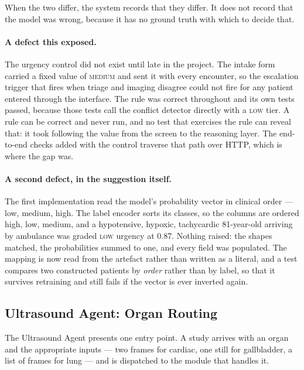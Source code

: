 \begin{keystatement}
When the two differ, the system records that they differ. It does not record that the model was
wrong, because it has no ground truth with which to decide that.
\end{keystatement}

\paragraph{A defect this exposed.} The urgency control did not exist until late in the project.
The intake form carried a fixed value of \textsc{medium} and sent it with every encounter, so
the escalation trigger that fires when triage and imaging disagree could not fire for any
patient entered through the interface. The rule was correct throughout and its own tests passed,
because those tests call the conflict detector directly with a \textsc{low} tier. A rule can be
correct and never run, and no test that exercises the rule can reveal that: it took following
the value from the screen to the reasoning layer. The end-to-end checks added with the control
traverse that path over HTTP, which is where the gap was.

\paragraph{A second defect, in the suggestion itself.} The first implementation read the
model's probability vector in clinical order --- low, medium, high. The label encoder sorts its
classes, so the columns are ordered high, low, medium, and a hypotensive, hypoxic, tachycardic
81-year-old arriving by ambulance was graded \textsc{low} urgency at 0.87. Nothing raised: the
shapes matched, the probabilities summed to one, and every field was populated. The mapping is
now read from the artefact rather than written as a literal, and a test compares two
constructed patients by \emph{order} rather than by label, so that it survives retraining and
still fails if the vector is ever inverted again.

\subsection{Ultrasound Agent: Organ Routing}
\label{subsec:ultrasound-agent}

The Ultrasound Agent presents one entry point. A study arrives with an organ and the
appropriate inputs --- two frames for cardiac, one still for gallbladder, a list of frames for
lung --- and is dispatched to the module that handles it.

